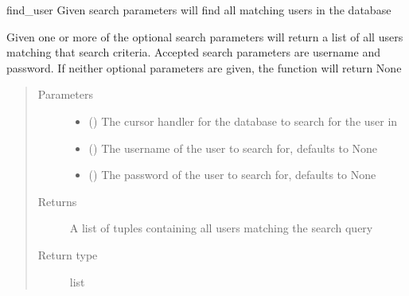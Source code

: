 \documentclass[letterpaper,10pt,english]{sphinxmanual}
\begin{document}
\begin{fulllineitems}
\label{\detokenize{index:data.database.find_user}}
find\_user Given search parameters will find all matching users in the database

Given one or more of the optional search parameters will return a list of all users
matching that search criteria. Accepted search parameters are username and password.
If neither optional parameters are given, the function will return None
\begin{quote}\begin{description}
\item[{Parameters}] \leavevmode\begin{itemize}
\item {} 
 () \textendash{} The cursor handler for the database to search for the user in

\item {} 
 (\sphinxstyleliteralemphasis{\sphinxupquote{, }}) \textendash{} The username of the user to search for, defaults to None

\item {} 
 (\sphinxstyleliteralemphasis{\sphinxupquote{, }}) \textendash{} The password of the user to search for, defaults to None

\end{itemize}

\item[{Returns}] \leavevmode
A list of tuples containing all users matching the search query

\item[{Return type}] \leavevmode
list

\end{description}\end{quote}

\end{fulllineitems}
\end{document}

